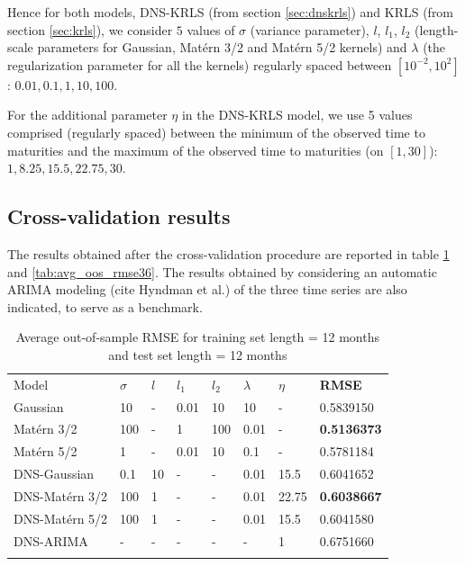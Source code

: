 \medskip

Hence for both models, DNS-KRLS (from section \ref{sec:dnskrls}) and KRLS (from section \ref{sec:krls}), we consider $5$ values of $\sigma$ (variance parameter), $l$, $l_1$, $l_2$ (length-scale parameters for Gaussian, Mat\'ern 3/2 and Mat\'ern 5/2 kernels) and $\lambda$ (the regularization parameter for all the kernels) regularly spaced between $\left[ 10^{-2}, 10^2\right]$: $0.01, 0.1, 1, 10, 100$. 

\medskip

For the additional parameter $\eta$ in the DNS-KRLS model, we use 5 values comprised (regularly spaced) between the minimum of the observed time to maturities  and the maximum of the observed time to maturities (on $\left[1, 30\right]$): $1, 8.25, 15.5, 22.75, 30$.


\subsection{Cross-validation results}

The results obtained after the cross-validation procedure are reported in table \ref{tab:avg_oos_rmse12} and \ref{tab:avg_oos_rmse36}. The results obtained by considering an automatic ARIMA modeling (cite Hyndman et al.) of the three time series are also indicated, to serve as a benchmark. 

\begin{table}[!htb]
\begin{center}
\caption{Average out-of-sample RMSE for training set length = 12 months and test set length = 12 months}
\label{tab:avg_oos_rmse12}       %
\begin{tabular}{llllllll}
\hline\noalign{\smallskip}
Model              & $\sigma$ & $l$ & $l_1$ & $l_2$  & $\lambda$  & $\eta$  & \textbf{RMSE}  \\
\noalign{\smallskip}\hline\noalign{\smallskip}
  Gaussian         &    10 &  - &   0.01&    10 &    10 & - & 0.5839150 \\
  Mat\'ern 3/2     &   100 &  - & 1 & 100 &   0.01 & - & \textbf{0.5136373}\\
  Mat\'ern 5/2     &   1 & - & 0.01 & 10 & 0.1 & - & 0.5781184\\
\noalign{\smallskip}\hline\noalign{\smallskip}
  DNS-Gaussian     & 0.1 & 10 & - & - & 0.01 & 15.5 & 0.6041652\\
  DNS-Mat\'ern 3/2 & 100 & 1 & - & - & 0.01 & 22.75 & \textbf{0.6038667}\\
  DNS-Mat\'ern 5/2 & 100 & 1 & - & - & 0.01 & 15.5 & 0.6041580\\
  DNS-ARIMA & - & - & - & - & - & 1 & 0.6751660\\
\noalign{\smallskip}\hline
\end{tabular}
\end{center}
\end{table}

